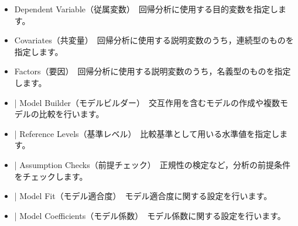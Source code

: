 \documentclass[
  12pt,
  a5jpaper,
  lualatex, ja=standard]{bxjsbook}
\providecommand{\tightlist}{%
  \setlength{\itemsep}{0pt}\setlength{\parskip}{0pt}}
\newenvironment{jmvsettings}{%
	\begin{center}%
	\begin{tcolorbox}[%
		title=設定項目,
		colframe=gmoji,
		colbacktitle=gmoji,
		colback=gmoji!2!white,
		breakable,
		width=.9\textwidth,
		]\small\addtolength{\leftmargini}{-3\labelsep}%
	}%
	{\end{tcolorbox}\end{center}}
\begin{document}
\begin{jmvsettings}

\begin{itemize}
\tightlist
\item
  Dependent Variable（従属変数）　回帰分析に使用する目的変数を指定します。
\item
  Covariates（共変量）　回帰分析に使用する説明変数のうち，連続型のものを指定します。
\item
  Factors（要因）　回帰分析に使用する説明変数のうち，名義型のものを指定します。
\item
  \colorbox{bar}{\textcolor{gmoji2}{| Model Builder}}（モデルビルダー）　交互作用を含むモデルの作成や複数モデルの比較を行います。
\item
  \colorbox{bar}{\textcolor{gmoji2}{| Reference Levels}}（基準レベル）　比較基準として用いる水準値を指定します。
\item
  \colorbox{bar}{\textcolor{gmoji2}{| Assumption Checks}}（前提チェック）　正規性の検定など，分析の前提条件をチェックします。
\item
  \colorbox{bar}{\textcolor{gmoji2}{| Model Fit}}（モデル適合度）　モデル適合度に関する設定を行います。
\item
  \colorbox{bar}{\textcolor{gmoji2}{| Model Coefficients}}（モデル係数）　モデル係数に関する設定を行います。

\end{itemize}
\end{jmvsettings}
\end{document}
